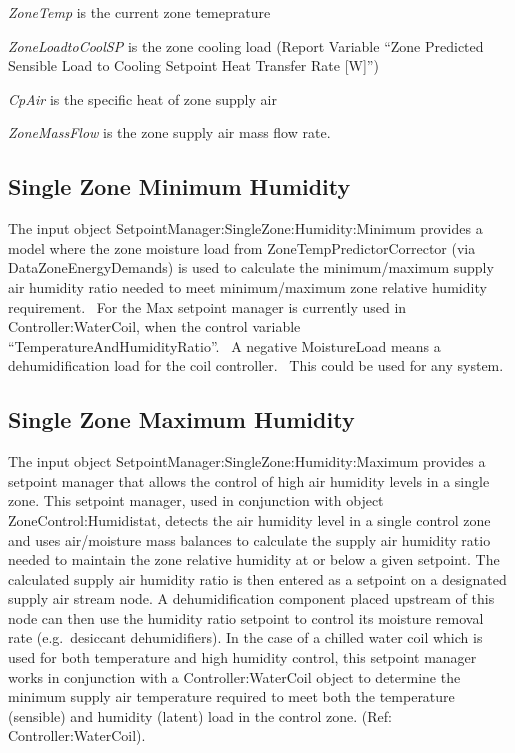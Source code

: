 \emph{ZoneTemp} is the current zone temeprature

\emph{ZoneLoadtoCoolSP} is the zone cooling load (Report Variable ``Zone Predicted Sensible Load to Cooling Setpoint Heat Transfer Rate {[}W{]}'')

\emph{CpAir} is the specific heat of zone supply air

\emph{ZoneMassFlow} is the zone supply air mass flow rate.

\subsection{Single Zone Minimum Humidity}\label{single-zone-minimum-humidity}

The input object SetpointManager:SingleZone:Humidity:Minimum provides a model where the zone moisture load from ZoneTempPredictorCorrector (via DataZoneEnergyDemands) is used to calculate the minimum/maximum supply air humidity ratio needed to meet minimum/maximum zone relative humidity requirement.~ For the Max setpoint manager is currently used in Controller:WaterCoil, when the control variable ``TemperatureAndHumidityRatio''.~ A negative MoistureLoad means a dehumidification load for the coil controller.~ This could be used for any system.

\subsection{Single Zone Maximum Humidity}\label{single-zone-maximum-humidity}

The input object SetpointManager:SingleZone:Humidity:Maximum provides a setpoint manager that allows the control of high air humidity levels in a single zone. This setpoint manager, used in conjunction with object ZoneControl:Humidistat, detects the air humidity level in a single control zone and uses air/moisture mass balances to calculate the supply air humidity ratio needed to maintain the zone relative humidity at or below a given setpoint. The calculated supply air humidity ratio is then entered as a setpoint on a designated supply air stream node. A dehumidification component placed upstream of this node can then use the humidity ratio setpoint to control its moisture removal rate (e.g.~desiccant dehumidifiers). In the case of a chilled water coil which is used for both temperature and high humidity control, this setpoint manager works in conjunction with a Controller:WaterCoil object to determine the minimum supply air temperature required to meet both the temperature (sensible) and humidity (latent) load in the control zone. (Ref: Controller:WaterCoil).

